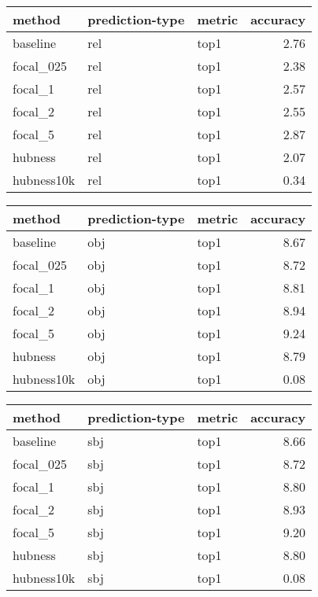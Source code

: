 \begin{tabular}{lllr}
\toprule
     method & prediction-type & metric &  accuracy \\
\midrule
   baseline &             rel &   top1 &      2.76 \\
  focal\_025 &             rel &   top1 &      2.38 \\
    focal\_1 &             rel &   top1 &      2.57 \\
    focal\_2 &             rel &   top1 &      2.55 \\
    focal\_5 &             rel &   top1 &      2.87 \\
    hubness &             rel &   top1 &      2.07 \\
 hubness10k &             rel &   top1 &      0.34 \\
\bottomrule
\end{tabular}
\begin{tabular}{lllr}
\toprule
     method & prediction-type & metric &  accuracy \\
\midrule
   baseline &             obj &   top1 &      8.67 \\
  focal\_025 &             obj &   top1 &      8.72 \\
    focal\_1 &             obj &   top1 &      8.81 \\
    focal\_2 &             obj &   top1 &      8.94 \\
    focal\_5 &             obj &   top1 &      9.24 \\
    hubness &             obj &   top1 &      8.79 \\
 hubness10k &             obj &   top1 &      0.08 \\
\bottomrule
\end{tabular}
\begin{tabular}{lllr}
\toprule
     method & prediction-type & metric &  accuracy \\
\midrule
   baseline &             sbj &   top1 &      8.66 \\
  focal\_025 &             sbj &   top1 &      8.72 \\
    focal\_1 &             sbj &   top1 &      8.80 \\
    focal\_2 &             sbj &   top1 &      8.93 \\
    focal\_5 &             sbj &   top1 &      9.20 \\
    hubness &             sbj &   top1 &      8.80 \\
 hubness10k &             sbj &   top1 &      0.08 \\
\bottomrule
\end{tabular}
